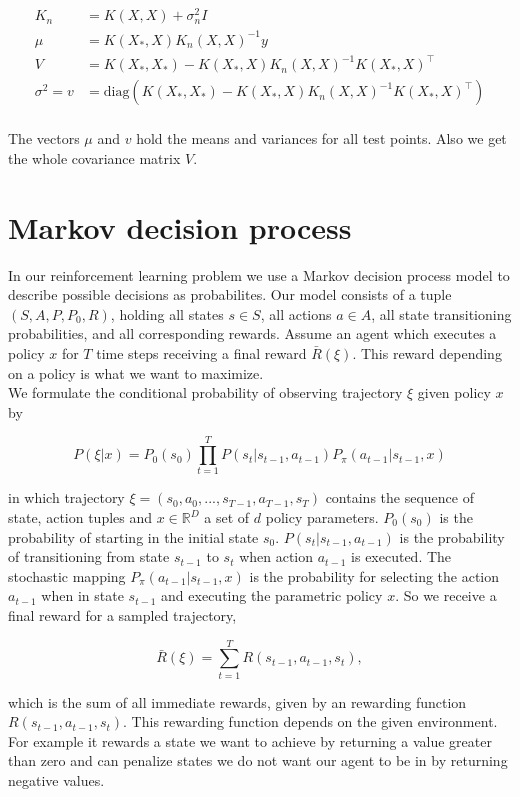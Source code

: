\begin{align}
    K_n &= K(X,X)+\sigma_n^2 I \label{eq:kNoise} \\
    \mu &= K(X_*,X)K_n(X,X)^{-1}y \label{eq:meanGauss} \\
    V &= K(X_*,X_*)-K(X_*,X)K_n(X,X)^{-1}K(X_*,X)^\top \label{eq:wholeVar} \\
    \sigma^2 = v &= \mathrm{diag}(K(X_*,X_*)-K(X_*,X)K_n(X,X)^{-1}K(X_*,X)^\top) \label{eq:vectorVar} \\ \nonumber
\end{align}

The vectors $\mu$ and $v$ hold the means and variances for all test points. Also we get the whole covariance matrix $V$.

\section{Markov decision process}
In our reinforcement learning problem we use a Markov decision process model to describe possible decisions as probabilites. Our model consists of a tuple $(S,A,P,P_{0},R)$, holding all states $s \in S$, all actions $a \in A$, all state transitioning probabilities, and all corresponding rewards. Assume an agent which executes a policy $x$ for $T$ time steps receiving a final reward $\bar{R}(\xi)$. This reward depending on a policy is what we want to maximize.\\
We formulate the conditional probability of observing trajectory $\xi$ given policy $x$ by

$$P(\xi|x) = P_{0}(s_{0}) \prod_{t=1}^{T} P(s_{t}|s_{t-1}, a_{t-1}) P_{\pi}(a_{t-1}|s_{t-1}, x)$$

in which trajectory $\xi=(s_{0},a_{0}, ..., s_{T-1}, a_{T-1}, s_{T})$ contains the sequence of state, action tuples and $x \in \mathbb{R}^{D}$ a set of $d$ policy parameters. $P_{0}(s_{0})$ is the probability of starting in the initial state $s_{0}$. $P(s_{t}|s_{t-1}, a_{t-1})$ is the probability of transitioning from state $s_{t-1}$ to $s_{t}$ when action $a_{t-1}$ is executed. The stochastic mapping $P_{\pi}(a_{t-1}|s_{t-1},x)$ is the probability for selecting the action $a_{t-1}$ when in state $s_{t-1}$ and executing the parametric policy $x$. So we receive a final reward for a sampled trajectory,

$$\bar{R}(\xi)=\sum_{t=1}^T R(s_{t-1}, a_{t-1}, s_{t}),$$

which is the sum of all immediate rewards, given by an rewarding function $R(s_{t-1}, a_{t-1}, s_{t})$. This rewarding function depends on the given environment. For example it rewards a state we want to achieve by returning a value greater than zero and can penalize states we do not want our agent to be in by returning negative values.

